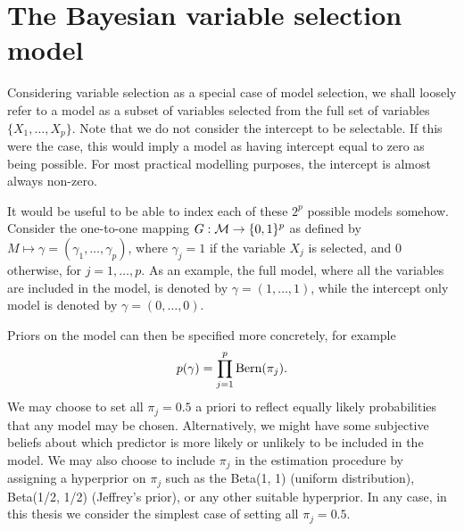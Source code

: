 \documentclass[a4paper,showframe,11pt]{report}
\begin{document}

\section{The Bayesian variable selection model}

Considering variable selection as a special case of model selection, we shall loosely refer to a model as a subset of variables selected from the full set of variables $\{ X_1, \dots, X_p \}$. 
Note that we do not consider the intercept to be selectable. 
If this were the case, this would imply a model as having intercept equal to zero as being possible. 
For most practical modelling purposes, the intercept is almost always non-zero.

It would be useful to be able to index each of these $2^p$ possible models somehow. 
Consider the one-to-one mapping $G:{\mathcal M} \to \{0,1\}^p$ as defined by $M \mapsto \gamma = (\gamma_1,\dots,\gamma_p)$, where $\gamma_j = 1$ if the variable $X_j$ is selected, and 0 otherwise, for $j=1,\dots,p$.
As an example, the full model, where all the variables are included in the model, is denoted by $\gamma = (1, \dots, 1)$, while the intercept only model is denoted by $\gamma = (0, \dots, 0)$.

Priors on the model can then be specified more concretely, for example 
\begin{equation}\label{eq:priorgamma}
  p(\gamma) = \prod_{j=1}^p \operatorname{Bern}(\pi_j).
\end{equation}
We may choose to set all $\pi_j = 0.5$ a priori to reflect equally likely probabilities that any model may be chosen.
Alternatively, we might have some subjective beliefs about which predictor is more likely or unlikely to be included in the model.
We may also choose to include $\pi_j$ in the estimation procedure by assigning a hyperprior on $\pi_j$ such as the Beta(1, 1) (uniform distribution), Beta(1/2, 1/2) (Jeffrey's prior), or any other suitable hyperprior.
In any case, in this thesis we consider the simplest case of setting all $\pi_j = 0.5$.
\end{document}
